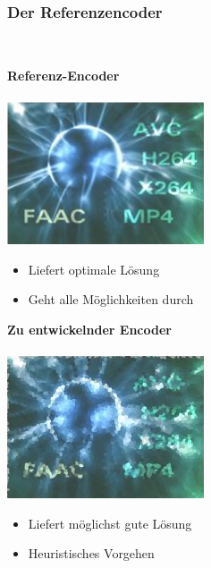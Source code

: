 \documentclass[t]{beamer}
\begin{document}
\begin{frame}
	\frametitle{Der Referenzencoder}
	~\\
	\begin{minipage}{5.3cm}
		\textbf{Referenz-Encoder} ~\\ ~\\
		\includegraphics[scale=.5]{encoder.png}
		~\\
		\begin{itemize}
			\item<2-> Liefert optimale Lösung
			\item<4-> Geht alle Möglichkeiten durch
		\end{itemize}
	\end{minipage}
	\hfill	
	\begin{minipage}{5.3cm}
		\textbf{Zu entwickelnder Encoder} ~\\ ~\\
		\includegraphics[scale=.5]{encoder-crystalized.png}
		~\\
		\begin{itemize}
			\item<3-> Liefert möglichst gute Lösung
			\item<6-> Heuristisches Vorgehen			
		\end{itemize}
	\end{minipage}
\end{frame}
\end{document}
